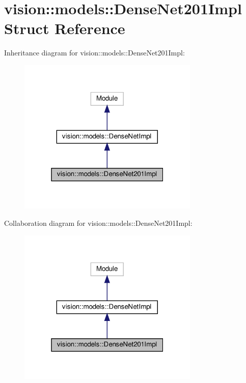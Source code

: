 \hypertarget{structvision_1_1models_1_1DenseNet201Impl}{}\section{vision\+:\+:models\+:\+:Dense\+Net201\+Impl Struct Reference}
\label{structvision_1_1models_1_1DenseNet201Impl}


Inheritance diagram for vision\+:\+:models\+:\+:Dense\+Net201\+Impl\+:
\nopagebreak
\begin{figure}[H]
\begin{center}
\leavevmode
\includegraphics[width=244pt]{structvision_1_1models_1_1DenseNet201Impl__inherit__graph}
\end{center}
\end{figure}


Collaboration diagram for vision\+:\+:models\+:\+:Dense\+Net201\+Impl\+:
\nopagebreak
\begin{figure}[H]
\begin{center}
\leavevmode
\includegraphics[width=244pt]{structvision_1_1models_1_1DenseNet201Impl__coll__graph}
\end{center}
\end{figure}
